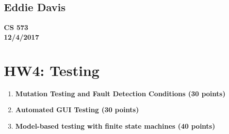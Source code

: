 \documentclass{report}
\begin{document}
\subsection*{Eddie Davis}
\textbf{CS 573}\\
\textbf{12/4/2017}\\

\section*{HW4: Testing}

\begin{enumerate}
	\item \textbf{Mutation Testing and Fault Detection Conditions (30 points)}

	\item \textbf{Automated GUI Testing (30 points)}
	
	\item \textbf{Model-based testing with finite state machines (40 points)}
\end{enumerate}
\end{document}
